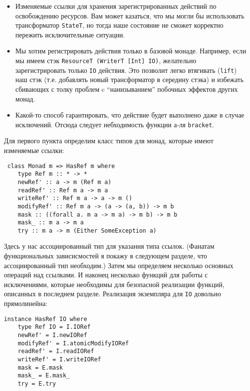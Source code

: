 \begin{itemize}
\item Изменяемые ссылки для хранения зарегистрированных действий по освобождению
ресурсов. Вам может казаться, что мы могли бы использовать трансформатор \lstinline'StateT',
но тогда наше состояние не сможет корректно пережить исключительные ситуации.

\item Мы хотим регистрировать действия только в базовой монаде. Например, если мы имеем
стэк \lstinline'ResourceT (WriterT [Int] IO)', желательно зарегистрировать
только \lstinline'IO' действия. Это позволит легко втягивать (\lstinline'lift') наш стэк (т.е. добавлять новый
трансформатор в середину стэка) и избежать сбивающих с толку проблем c ``нанизыванием'' побочных эффектов других монад.


\item Какой-то способ гарантировать, что действие будет выполнено даже в случае
исключений. Отсюда следует небходимость функции а-ля \lstinline'bracket'.
\end{itemize}

Для первого пункта определим класс типов для монад, которые имеют изменяемые ссылки:
\begin{lstlisting}
 class Monad m => HasRef m where
    type Ref m :: * -> *
    newRef' :: a -> m (Ref m a)
    readRef' :: Ref m a -> m a
    writeRef' :: Ref m a -> a -> m ()
    modifyRef' :: Ref m a -> (a -> (a, b)) -> m b
    mask :: ((forall a. m a -> m a) -> m b) -> m b
    mask_ :: m a -> m a
    try :: m a -> m (Either SomeException a)
\end{lstlisting}

Здесь у нас ассоциированный тип для указания типа ссылок. (Фанатам функциональных
зависисмостей я покажу в следующем разделе, что ассоциированный тип необходим.)
Затем мы определяем несколько основных операций над ссылками.
И наконец несколько функций для работы с
исключениями, которые необходимы для безопасной реализации функций, описанных в
последнем разделе. Реализация экземпляра для \lstinline'IO' довольно прямолинейна:

\begin{lstlisting}
instance HasRef IO where
    type Ref IO = I.IORef
    newRef' = I.newIORef
    modifyRef' = I.atomicModifyIORef
    readRef' = I.readIORef
    writeRef' = I.writeIORef
    mask = E.mask
    mask_ = E.mask_
    try = E.try
\end{lstlisting}

